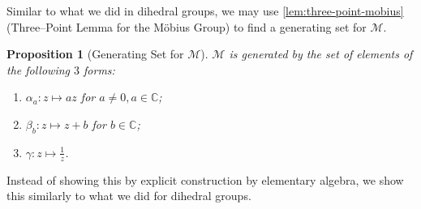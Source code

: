 \documentclass{article}
\newtheorem{proposition}[theorem]{Proposition}
\theoremstyle{definition}
\theoremstyle{remark}
\newcommand{\functionmap}[3]{#1:#2\mapsto #3}
\newcommand{\CC}{\mathbb{C}}
\newcommand{\mobius}{\mathcal{M}}
\begin{document}
Similar to what we did in dihedral groups, we may use \autoref{lem:three-point-mobius} (Three--Point Lemma for the M\"{o}bius Group) to find a generating set for \(\mobius\).

\begin{proposition}[Generating Set for \(\mobius\)]
    \label{prop:generating-set-mobius}%
    \(\mobius\) is generated by the set of elements of the following \(3\) forms:
    \begin{enumerate}
        \item \(\functionmap{\alpha_{a}}{z}{az}\) for \(a \neq 0, a \in \CC\);
        \item \(\functionmap{\beta_{b}}{z}{z + b}\) for \(b \in \CC\);
        \item \(\functionmap{\gamma}{z}{\frac{1}{z}}\).
    \end{enumerate}
\end{proposition}

Instead of showing this by explicit construction by elementary algebra, we show this similarly to what we did for dihedral groups.
\end{document}
